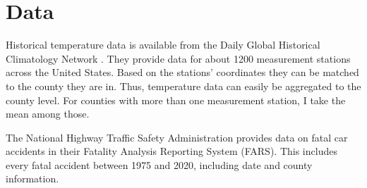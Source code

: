 
\section{Data}

Historical temperature data is available from the Daily Global Historical Climatology Network \citep{Menne_2012}. They provide data for about 1200 measurement stations across the United States. Based on the stations' coordinates they can be matched to the county they are in. Thus, temperature data can easily be aggregated to the county level. For counties with more than one measurement station, I take the mean among those.

The National Highway Traffic Safety Administration provides data on fatal car accidents in their Fatality Analysis Reporting System (FARS). This includes every fatal accident between 1975 and 2020, including date and county information.